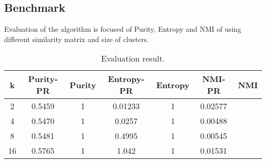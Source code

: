 \documentclass{article}
\begin{document}
\subsection{Benchmark}
Evaluation of the algorithm is focused of Purity, Entropy and NMI
of using different similarity matrix and size of clusters.

\begin{table}[tbh]
  \center
  \footnotesize
  \begin{tabular}{c|c|c|c|c|c|c}
    \textbf{k} & \textbf{Purity-PR} & \textbf{Purity} & \textbf{Entropy-PR} & \textbf{Entropy} & \textbf{NMI-PR} & \textbf{NMI} \\
    \hline
    2 & 0.5459 & 1 & 0.01233 & 1 & 0.02577 \\
    \hline
    4 & 0.5470 & 1 & 0.0257 & 1 & 0.00488 \\
    \hline
    8 & 0.5481 & 1 & 0.4995 & 1 & 0.00545 \\
    \hline
    16 & 0.5765 & 1 & 1.042 & 1 & 0.01531 \\
  \end{tabular}
  \caption{Evaluation result.}
  \label{result}
\end{table}
\end{document}
